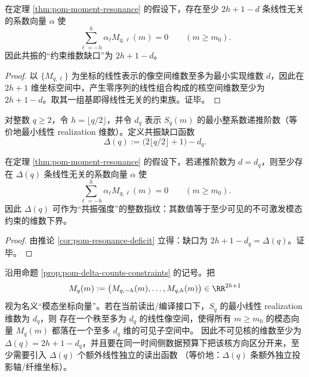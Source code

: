 

\begin{corollary}[模态约束的维数缺口]\label{cor:pom-resonance-deficit}
在定理 \ref{thm:pom-moment-resonance} 的假设下，存在至少
\(
2h+1-d
\)
条线性无关的系数向量 $\alpha$ 使
\[
\sum_{\ell=-h}^{h}\alpha_\ell M_{q,\ell}(m)=0\qquad(m\ge m_0).
\]
因此共振的“约束维数缺口”为 $2h+1-d$。
\end{corollary}
\begin{proof}
以 $\{M_{q,\ell}\}$ 为坐标的线性表示的像空间维数至多为最小实现维数 $d$，因此在 $2h+1$ 维坐标空间中，产生零序列的线性组合构成的核空间维数至少为 $2h+1-d$。取其一组基即得线性无关的约束族。证毕。
\end{proof}

\begin{definition}\label{def:pom-resonance-gap-delta}
对整数 \(q\ge 2\)，令 \(h=\lfloor q/2\rfloor\)，并令 \(d_q\) 表示 \(S_q(m)\) 的最小整系数递推阶数（等价地最小线性 realization 维数）。定义共振缺口函数
$$
\Delta(q):=\bigl(2\lfloor q/2\rfloor+1\bigr)-d_q.
$$
\end{definition}

\begin{proposition}\label{prop:pom-delta-counts-constraints}
在定理 \ref{thm:pom-moment-resonance} 的假设下，若递推阶数为 \(d=d_q\)，则至少存在 \(\Delta(q)\) 条线性无关的系数向量 \(\alpha\) 使
\[
\sum_{\ell=-h}^{h}\alpha_\ell M_{q,\ell}(m)=0\qquad(m\ge m_0).
\]
因此 \(\Delta(q)\) 可作为“共振强度”的整数指纹：其数值等于至少可见的不可激发模态约束的维数下界。
\end{proposition}

\begin{proof}
由推论 \ref{cor:pom-resonance-deficit} 立得：缺口为 \(2h+1-d_q=\Delta(q)\)。证毕。
\end{proof}

\begin{corollary}\label{cor:pom-delta-min-extra-readouts}
沿用命题 \ref{prop:pom-delta-counts-constraints} 的记号。把
\[
M_q(m):=\bigl(M_{q,-h}(m),\ldots,M_{q,h}(m)\bigr)\in\RR^{2h+1}
\]
视为名义“模态坐标向量”。若在当前读出/编译接口下，\(S_q\) 的最小线性 realization 维数为 \(d_q\)，则
存在一个秩至多为 \(d_q\) 的线性像空间，使得所有 \(m\ge m_0\) 的模态向量 \(M_q(m)\) 都落在一个至多 \(d_q\) 维的可见子空间中。
因此不可见核的维数至少为
\(
\Delta(q)=2h+1-d_q
\)，并且要在同一时间侧数据预算下把该核方向区分开来，至少需要引入 \(\Delta(q)\) 个额外线性独立的读出函数
（等价地：\(\Delta(q)\) 条额外独立投影轴/纤维坐标）。
\end{corollary}


